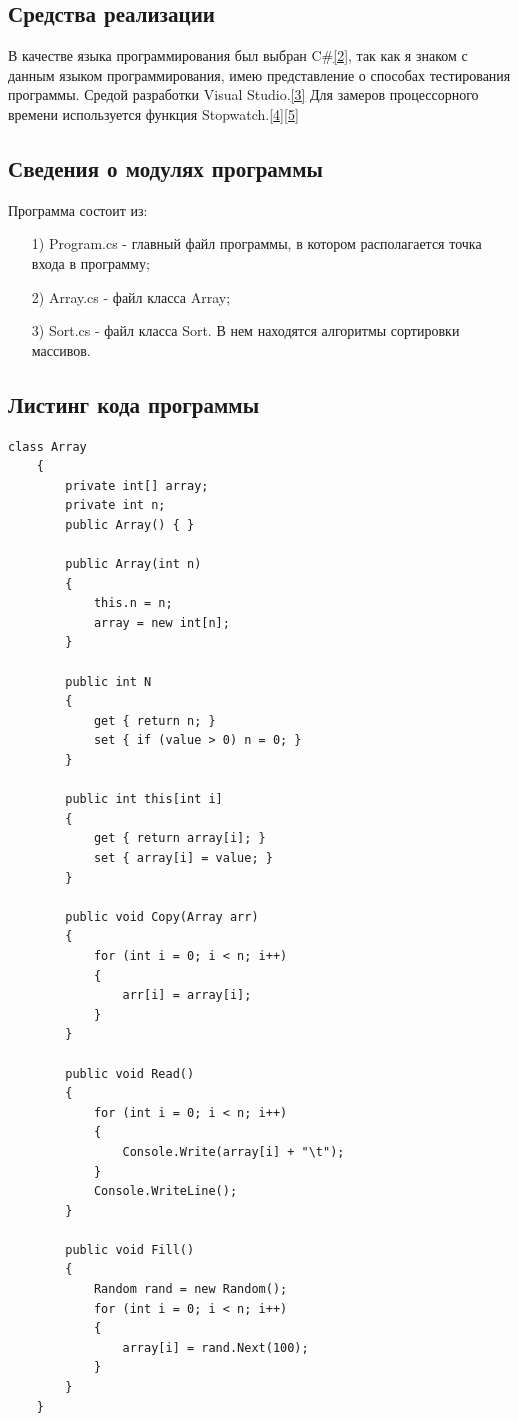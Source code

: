\documentclass[14pt, a4paper]{extarticle}
\begin{document}
\subsection{Средства реализации}
В качестве языка программирования был выбран C\#\hyperref[literature]{[2]}, так как я знаком с данным языком программирования, имею представление о способах тестирования программы.
\noindent Средой разработки Visual Studio.\hyperref[literature]{[3]}
\noindent Для замеров процессорного времени используется функция Stopwatch.\hyperref[literature]{[4]}\hyperref[literature]{[5]}

\subsection{Сведения о модулях программы}
Программа состоит из:
\begin{enumerate}
	\item[1)] Program.cs - главный файл программы, в котором располагается точка входа в программу;
	\item[2)] Array.cs - файл класса Array;
	\item[3)] Sort.cs - файл класса Sort. В нем находятся алгоритмы сортировки массивов.
\end{enumerate}

\subsection{Листинг кода программы}
\begin{lstlisting}[label=Array,caption=Класс Array для работы с массивами]
	class Array
	{
		private int[] array;
		private int n;
		public Array() { }
		
		public Array(int n)
		{
			this.n = n;
			array = new int[n];
		}
		
		public int N
		{
			get { return n; }
			set { if (value > 0) n = 0; }
		}
		
		public int this[int i]
		{
			get { return array[i]; }
			set { array[i] = value; }
		}
		
		public void Copy(Array arr)
		{
			for (int i = 0; i < n; i++)
			{
				arr[i] = array[i];
			}
		}
		
		public void Read()
		{
			for (int i = 0; i < n; i++)
			{
				Console.Write(array[i] + "\t");
			}
			Console.WriteLine();
		}
		
		public void Fill()
		{
			Random rand = new Random();
			for (int i = 0; i < n; i++)
			{
				array[i] = rand.Next(100);
			}
		}
	}
\end{lstlisting}
\end{document}
